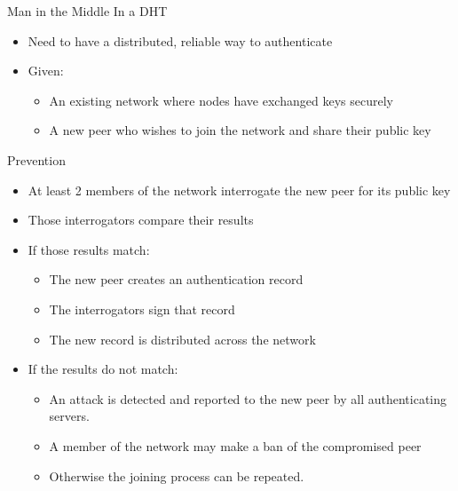 \documentclass[11pt]{beamer}
\begin{document}
\begin{frame}{Man in the Middle In a DHT}
	
	\begin{itemize}
		\item Need to have a distributed, reliable way to authenticate 
		\item Given:
		\begin{itemize}
			\item An existing network where nodes have exchanged keys securely
			\item A new peer who wishes to join the network and share their public key
			
		\end{itemize}
	\end{itemize}
	
	
\end{frame}



\begin{frame}{Prevention}
	
	\begin{itemize}
		\item  At least 2 members of the network interrogate the new peer for its public key
		\item  Those interrogators compare their results
		\item  If those results match:
		\begin{itemize}
			
			\item The new peer creates an authentication record
			\item The interrogators sign that record
			\item The new record is distributed across the network
		\end{itemize}
		
		
		\item  If the results do not match:
		\begin{itemize}
			
			\item An attack is detected and reported to the new peer by all authenticating servers.
			\item A member of the network may make a ban of the compromised peer
			\item Otherwise the joining process can be repeated.
		\end{itemize}
		
	\end{itemize}
	
	
\end{frame}
\end{document}
